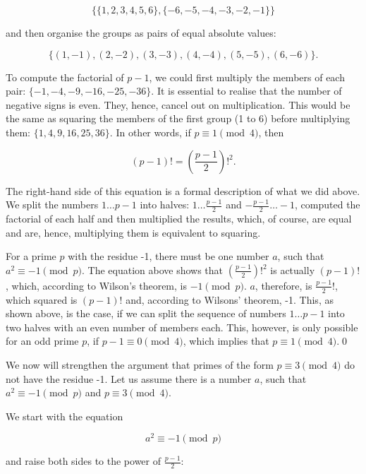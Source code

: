 \documentclass{scrreprt}
\begin{document}
\[
\lbrace\lbrace 1,2,3,4,5,6\rbrace, 
       \lbrace -6,-5,-4,-3,-2,-1\rbrace\rbrace
\]

and then organise the groups as pairs of equal 
absolute values:

\[
\lbrace (1,-1), (2,-2), (3,-3), (4,-4), (5,-5), (6,-6)\rbrace.
\]

To compute the factorial of $p-1$,
we could first multiply the members of each pair:
$\lbrace -1, -4, -9, -16, -25, -36\rbrace$.
It is essential to realise 
that the number of negative signs is even.
They, hence, cancel out on multiplication.
This would be the same as squaring 
the members of the first group (1 to 6)
before multiplying them:
$\lbrace 1, 4, 9, 16, 25, 36\rbrace$.
In other words,
if $p \equiv 1 \pmod{4}$, then 

\begin{equation}
(p-1)! = \left(\frac{p-1}{2}\right)!^2.
\end{equation}

The right-hand side of this equation
is a formal description of what we did above.
We split the numbers $1\dots p-1$ into halves:
$1\dots \frac{p-1}{2}$ and $-\frac{p-1}{2} \dots -1$,
computed the factorial of each half and then
multiplied the results, which, of course, are equal
and are, hence, multiplying them is equivalent to squaring.

For a prime $p$ with the residue -1, there must be one number
$a$, such that
$a^2 \equiv -1 \pmod{p}$.
The equation above shows that 
$(\frac{p-1}{2})!^2$ is actually $(p-1)!$,
which, according to Wilson's theorem, is $-1 \pmod{p}$.
$a$, therefore, is $\frac{p-1}{2}!$, which squared
is $(p-1)!$ and, according to Wilsons' theorem, -1.
This, as shown above, is the case,
if we can split the sequence of numbers $1\dots p-1$
into two halves with an even number of members each.
This, however, is only possible for an odd prime $p$,
if $p-1 \equiv 0 \pmod{4}$,
which implies that $p \equiv 1 \pmod{4}$.\qed

We now will strengthen the argument that primes of the form
$p \equiv 3 \pmod{4}$ do not have the residue -1.
Let us assume there is a number $a$,
such that $a^2 \equiv -1 \pmod{p}$ and 
$p \equiv 3 \pmod{4}$.

We start with the equation

\begin{equation}
a^2 \equiv -1 \pmod{p}
\end{equation}

and raise both sides to the power of $\frac{p-1}{2}$:
\end{document}

